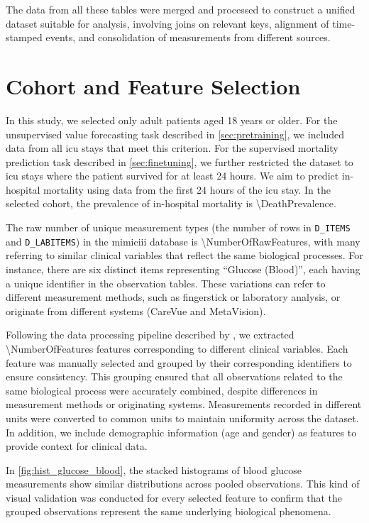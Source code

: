 The data from all these tables were merged and processed to construct a unified dataset suitable for analysis, involving joins on relevant keys, alignment of time-stamped events, and consolidation of measurements from different sources.

\section{Cohort and Feature Selection}

In this study, we selected only adult patients aged 18 years or older. For the unsupervised value forecasting task described in \cref{sec:pretraining}, we included data from all \gls{icu} stays that meet this criterion. For the supervised mortality prediction task described in \cref{sec:finetuning}, we further restricted the dataset to \gls{icu} stays where the patient survived for at least \num{24} hours. We aim to predict in-hospital mortality using data from the first \num{24} hours of the \gls{icu} stay. In the selected cohort, the prevalence of in-hospital mortality is \num{\DeathPrevalence}.

The raw number of unique measurement types (the number of rows in \texttt{D\_ITEMS} and \texttt{D\_LABITEMS}) in the \gls{mimiciii} database is \num{\NumberOfRawFeatures}, with many referring to similar clinical variables that reflect the same biological processes. For instance, there are six distinct items representing ``Glucose (Blood)'', each having a unique identifier in the observation tables. These variations can refer to different measurement methods, such as fingerstick or laboratory analysis, or originate from different systems (CareVue and MetaVision).

Following the data processing pipeline described by \textcite{STraTS2022}, we extracted \num{\NumberOfFeatures} features corresponding to different clinical variables. Each feature was manually selected and grouped by their corresponding identifiers to ensure consistency. This grouping ensured that all observations related to the same biological process were accurately combined, despite differences in measurement methods or originating systems. Measurements recorded in different units were converted to common units to maintain uniformity across the dataset. In addition, we include demographic information (age and gender) as features to provide context for clinical data.

In \cref{fig:hist_glucose_blood}, the stacked histograms of blood glucose measurements show similar distributions across pooled observations. This kind of visual validation was conducted for every selected feature to confirm that the grouped observations represent the same underlying biological phenomena.

